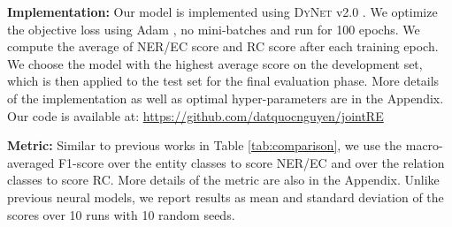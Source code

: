 \documentclass[runningheads]{llncs}
\begin{document}
\noindent\textbf{Implementation:} Our model is implemented using  \textsc{DyNet} v2.0 \cite{dynet}. We optimize the objective loss using Adam  \cite{KingmaB14}, no mini-batches and run for 100 epochs.  We  compute the average of NER/EC score and RC score after each training epoch. We choose the model with the highest average score on the development set, which is then applied to the test set for the final evaluation phase. More details of the implementation as well as optimal hyper-parameters are  in the Appendix. Our code is available at: \url{https://github.com/datquocnguyen/jointRE}  

\medskip

\noindent\textbf{Metric:} Similar to  previous works in Table  \ref{tab:comparison}, we use the macro-averaged F1-score over the entity classes to score NER/EC and over the relation classes to score RC.  
More details of the metric are also in the Appendix. 
 Unlike previous neural models, we report   results as mean and standard deviation of the scores over 10 runs with 10 random seeds. 
\end{document}
